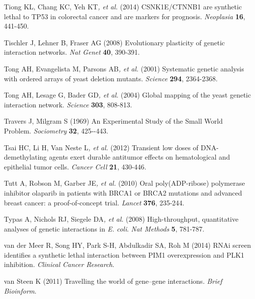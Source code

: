 \hypertarget{ENREF95}{}Tiong KL, Chang KC, Yeh KT\textit{, et al.}
(2014) CSNK1E/CTNNB1 are synthetic lethal to TP53 in colorectal cancer
and are markers for prognosis. \textit{Neoplasia} \textbf{16}, 441-450.



Tischler J, Lehner B, Fraser AG (2008) Evolutionary plasticity of
genetic interaction networks. \textit{Nat Genet} \textbf{40}, 390-391.



Tong AH, Evangelista M, Parsons AB\textit{, et al.} (2001) Systematic
genetic analysis with ordered arrays of yeast deletion mutants.
\textit{Science} \textbf{294}, 2364-2368.



Tong AH, Lesage G, Bader GD\textit{, et al.} (2004) Global mapping of
the yeast genetic interaction network. \textit{Science} \textbf{303},
808-813.



Travers J, Milgram S (1969) An Experimental Study of the Small World
Problem. \textit{Sociometry} \textbf{32}, 425-{}-443.



Tsai HC, Li H, Van Neste L\textit{, et al.} (2012) Transient low doses
of DNA-demethylating agents exert durable antitumor effects on
hematological and epithelial tumor cells. \textit{Cancer Cell}
\textbf{21}, 430-446.



Tutt A, Robson M, Garber JE\textit{, et al.} (2010) Oral
poly(ADP-ribose) polymerase inhibitor olaparib in patients with BRCA1
or BRCA2 mutations and advanced breast cancer: a proof-of-concept
trial. \textit{Lancet} \textbf{376}, 235-244.



Typas A, Nichols RJ, Siegele DA\textit{, et al.} (2008) High-throughput,
quantitative analyses of genetic interactions in \textit{E. coli}.
\textit{Nat Methods} \textbf{5}, 781-787.



\hypertarget{ENREF103}{}van der Meer R, Song HY, Park S-H, Abdulkadir
SA, Roh M (2014) RNAi screen identifies a synthetic lethal interaction
between PIM1 overexpression and PLK1 inhibition. \textit{Clinical
Cancer Research}.



\hypertarget{ENREF104}{}van Steen K (2011) Travelling the world of
gene--gene interactions. \textit{Brief Bioinform}.



